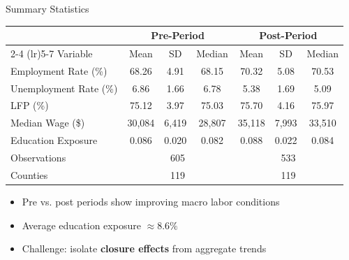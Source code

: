 \documentclass[aspectratio=169]{beamer}
\begin{document}
\begin{frame}{Summary Statistics}
  \begin{table}
  \tiny
  \centering
  \begin{tabular}{lcccccc}
  \toprule
  & \multicolumn{3}{c}{Pre-Period} & \multicolumn{3}{c}{Post-Period} \\
  \cmidrule(lr){2-4} \cmidrule(lr){5-7}
  Variable & Mean & SD & Median & Mean & SD & Median \\
  \midrule
  Employment Rate (\%) & 68.26 & 4.91 & 68.15 & 70.32 & 5.08 & 70.53 \\
  Unemployment Rate (\%) & 6.86 & 1.66 & 6.78 & 5.38 & 1.69 & 5.09 \\
  LFP (\%) & 75.12 & 3.97 & 75.03 & 75.70 & 4.16 & 75.97 \\
  Median Wage (\$) & 30,084 & 6,419 & 28,807 & 35,118 & 7,993 & 33,510 \\
  Education Exposure & 0.086 & 0.020 & 0.082 & 0.088 & 0.022 & 0.084 \\
  \midrule
  Observations & \multicolumn{3}{c}{605} & \multicolumn{3}{c}{533} \\
  Counties & \multicolumn{3}{c}{119} & \multicolumn{3}{c}{119} \\
  \bottomrule
  \end{tabular}
  \end{table}
  \vspace{0.3cm}
  \begin{itemize}
    \item Pre vs. post periods show improving macro labor conditions
    \item Average education exposure $\approx 8.6\%$
    \item Challenge: isolate \textbf{closure effects} from aggregate trends
  \end{itemize}
\end{frame}
\end{document}
